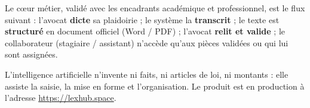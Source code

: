 Le cœur métier, validé avec les encadrants académique et professionnel, est le flux suivant : l'avocat \textbf{dicte} sa plaidoirie ; le système la \textbf{transcrit} ; le texte est \textbf{structuré} en document officiel (Word / PDF) ; l'avocat \textbf{relit et valide} ; le collaborateur (stagiaire / assistant) n'accède qu'aux pièces validées ou qui lui sont assignées.

L'intelligence artificielle n'invente ni faits, ni articles de loi, ni montants : elle assiste la saisie, la mise en forme et l'organisation. Le produit est en production à l'adresse \url{https://lexhub.space}.

\clearpage
\tableofcontents
\clearpage
\listoffigures
\listoftables
